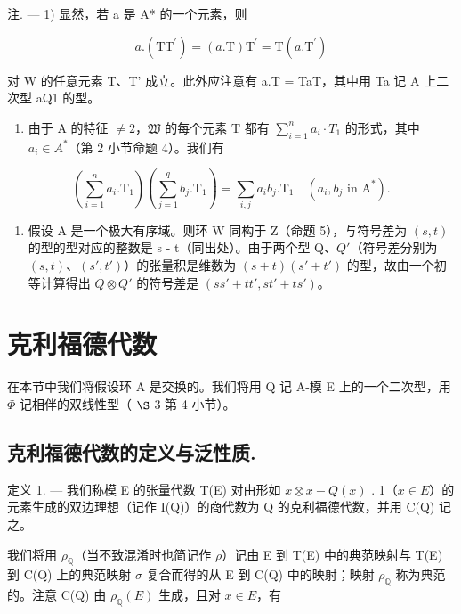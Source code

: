 注. --- 1) 显然，若 a 是 A* 的一个元素，则

\[
a. (\mathrm{TT} ^ {\prime}) = (a. \mathrm{T}) \mathrm{T} ^ {\prime} = \mathrm{T} (a. \mathrm{T} ^ {\prime})\tag{7}
\]

对 W 的任意元素 T、T' 成立。此外应注意有 a.T = TaT，其中用 Ta 记 A 上二次型 aQ1 的型。

\begin{enumerate}
\def\labelenumi{\arabic{enumi})}
\setcounter{enumi}{1}
\tightlist
\item
  由于 A 的特征 \(\neq 2\)，\(\mathfrak{W}\) 的每个元素 T 都有 \(\sum_{i=1}^{n} a_i \cdot T_1\) 的形式，其中 \(a_i \in A^*\)（第 2 小节命题 4）。我们有
\end{enumerate}

\[
(\sum_ {i = 1} ^ {n} a _ {i}. \mathrm{T} _ {1}) (\sum_ {j = 1} ^ {q} b _ {j}. \mathrm{T} _ {1}) = \sum_ {i, j} a _ {i} b _ {j}. \mathrm{T} _ {1} \quad (a _ {i}, b _ {j} \text {   in   } \mathrm{A} ^ {*}).\tag{8}
\]

\begin{enumerate}
\def\labelenumi{\arabic{enumi})}
\setcounter{enumi}{2}
\tightlist
\item
  假设 A 是一个极大有序域。则环 W 同构于 Z（命题 5），与符号差为 \((s, t)\) 的型的型对应的整数是 s - t（同出处）。由于两个型 Q、\(Q'\)（符号差分别为 \((s, t)\)、\((s', t')\)）的张量积是维数为 \((s + t)(s' + t')\) 的型，故由一个初等计算得出 \(Q \otimes Q'\) 的符号差是 \((ss' + tt', st' + ts')\)。
\end{enumerate}

\section{克利福德代数}

在本节中我们将假设环 A 是交换的。我们将用 Q 记 A-模 E 上的一个二次型，用 \(\Phi\) 记相伴的双线性型（ \(\S\) 3 第 4 小节）。

\subsection{克利福德代数的定义与泛性质.}

定义 1. --- 我们称模 E 的张量代数 T(E) 对由形如 \(x \otimes x - Q(x)\) . 1（\(x \in E\)）的元素生成的双边理想（记作 I(Q)）的商代数为 Q 的克利福德代数，并用 C(Q) 记之。

  我们将用 \(\rho_{\mathbb{Q}}\)（当不致混淆时也简记作 \(\rho\)）记由 E 到 T(E) 中的典范映射与 T(E) 到 C(Q) 上的典范映射 \(\sigma\) 复合而得的从 E 到 C(Q) 中的映射；映射 \(\rho_{\mathbb{Q}}\) 称为典范的。注意 C(Q) 由 \(\rho_{\mathbb{Q}}(E)\) 生成，且对 \(x \in E\)，有

